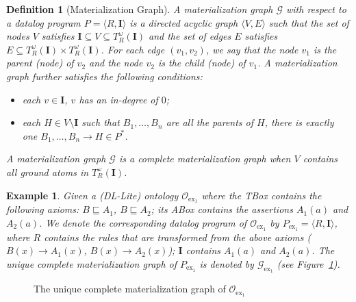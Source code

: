 \documentclass[final,1p,times]{elsarticle}
\newtheorem{example}{Example}
\newtheorem{definition}{Definition}
\begin{document}
\begin{definition}[Materialization Graph]\label{def:mg}
  A \emph{materialization graph} $\mathcal{G}$ with respect to a
  datalog program $P=\langle R, \textbf{I}\rangle$ is a directed
  acyclic graph $\langle V, E\rangle$ such that the set of nodes $V$
  satisfies $\textbf{I} \subseteq V\subseteq T_R^{\omega}(\textbf{I})$
  and the set of edges $E$ satisfies
  $E\subseteq T_R^{\omega}(\textbf{I})\times
  T_R^{\omega}(\textbf{I})$. For each edge $(v_1, v_2)$, we say that
  the node $v_1$ is the \emph{parent} (node) of $v_2$ and the node
  $v_2$ is the \emph{child} (node) of $v_1$. A materialization graph
  further satisfies the following conditions:
  \begin{itemize}
  \item each $v \in \textbf{I}$, $v$ has an in-degree of $0$;
  \item each $H \in V \setminus \textbf{I}$ such that $B_1,\ldots,B_n$
    are all the parents of $H$, there is exactly one
    $B_1,\ldots,B_n\rightarrow H\in P^*$.
  \end{itemize}
  A materialization graph $\mathcal{G}$ is a \emph{complete
    materialization graph} when $V$ contains all ground atoms in
  $T_R^{\omega}(\textbf{I})$.
\end{definition}

\begin{example}\label{exp:dllite}
  Given a (DL-Lite) ontology $\mathcal{O}_{\text{ex}_1}$ where the TBox
  contains the following axioms: $B\sqsubseteq A_1$,
  $B\sqsubseteq A_2$; its ABox contains the assertions $A_1(a)$ and
  $A_2(a)$.  We denote the corresponding datalog program of
  $\mathcal{O}_{\text{ex}_1}$ by
  $P_{\text{ex}_1}=\langle R, \textbf{I}\rangle$, where $R$ contains the
  rules that are transformed from the above axioms ($B(x) \to A_1(x)$,
  $B(x) \to A_2(x)$); $\textbf{I}$ contains $A_1(a)$ and $A_2(a)$.
  The unique complete materialization graph of $P_{\text{ex}_1}$ is denoted by
  $\mathcal{G}_{\text{ex}_1}$ (see Figure~\ref{fig:ex1}).
\end{example}

\begin{figure}[htbp]
\centering
{}
\caption{The unique  complete materialization graph of $\mathcal{O}_{\text{ex}_1}$}
\label{fig:ex1}
\end{figure}
\end{document}

